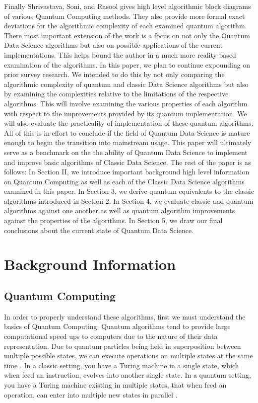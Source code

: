 \documentclass[conference]{IEEEtran}
\begin{document}
\newline
\indent Finally Shrivastava, Soni, and Rasool gives high level algorithmic block diagrams of various Quantum Computing methods. They also provide more formal exact deviations for the algorithmic complexity of each examined quantum algorithm. There most important extension of the work is a focus on not only the Quantum Data Science algorithms but also on possible applications of the current implementations. This helps bound the author in a much more reality based examination of the algorithms.\cite{b8}    
\newline
\indent In this paper, we plan to continue expounding on prior survey research. We intended to do this by not only comparing the algorithmic complexity of quantum and classic Data Science algorithms but also by examining the complexities relative to the limitations of the respective algorithms. This will involve examining the various properties of each algorithm with respect to the improvements provided by its quantum implementation. We will also evaluate the practicality of implementation of these quantum algorithms. All of this is in effort to conclude if the field of Quantum Data Science is mature enough to begin the transition into mainstream usage. 
\newline
\indent This paper will ultimately serve as a benchmark on the the ability of Quantum Data Science to implement and improve basic algorithms of Classic Data Science. The rest of the paper is as follows: In Section II, we introduce important background high level information on Quantum Computing as well as each of the Classic Data Science algorithms examined in this paper. In Section 3, we derive quantum equivalents to the classic algorithms introduced in Section 2. In Section 4, we evaluate classic and quantum algorithms against one another as well as quantum algorithm improvements against the properties of the algorithms. In Section 5, we draw our final conclusions about the current state of Quantum Data Science.    
\section{Background Information}

\subsection{Quantum Computing}
In order to properly understand these algorithms, first we must understand the basics of Quantum Computing. Quantum algorithms tend to provide large computational speed ups to computers due to the nature of their data representation. Due to quantum particles being held in superposition between multiple possible states, we can execute operations on multiple states at the same time \cite{b5}. In a classic setting, you have a Turing machine in a single state, which when feed an instruction, evolves into another single state. In a quantum setting, you have a Turing machine existing in multiple states, that when feed an operation, can enter into multiple new states in parallel \cite{b9}.   
\end{document}

